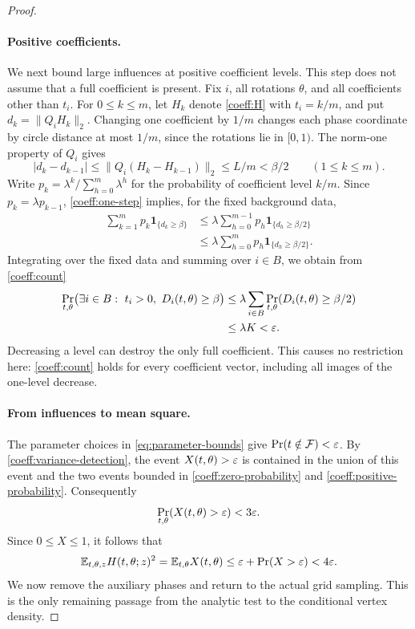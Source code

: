 \begin{proof}
\paragraph{Positive coefficients.}
We next bound large influences at positive coefficient levels.  This
step does not assume that a full coefficient is present.  Fix $i$,
all rotations $\theta$, and all coefficients other than $t_i$.
For $0\le k\le m$, let $H_k$ denote \eqref{coeff:H} with $t_i=k/m$,
and put $d_k=\|Q_iH_k\|_2$.  Changing one coefficient by $1/m$
changes each phase coordinate by circle distance at most $1/m$, since
the rotations lie in $[0,1)$.  The norm-one property of $Q_i$ gives
\begin{equation}\label{coeff:one-step}
 |d_k-d_{k-1}|
 \le\|Q_i(H_k-H_{k-1})\|_2
 \le L/m<\beta/2
 \qquad(1\le k\le m).
\end{equation}
Write $p_k=\lambda^k/\sum_{h=0}^m\lambda^h$ for the probability
of coefficient level $k/m$.  Since $p_k=\lambda p_{k-1}$,
\eqref{coeff:one-step} implies, for the fixed background data,
\begin{align*}
 \sum_{k=1}^m p_k\mathbf 1_{\{d_k\ge\beta\}}
 &\le\lambda\sum_{h=0}^{m-1}
              p_h\mathbf 1_{\{d_h\ge\beta/2\}}\\
 &\le\lambda\sum_{h=0}^m
              p_h\mathbf 1_{\{d_h\ge\beta/2\}}.
\end{align*}
Integrating over the fixed data and summing over $i\in B$, we obtain
from \eqref{coeff:count}
\begin{equation}\label{coeff:positive-probability}
 \begin{split}
 \Pr_{t,\theta}\bigl(
 \exists i\in B:\ t_i>0,\ D_i(t,\theta)\ge\beta
 \bigr)
 &\le\lambda\sum_{i\in B}
          \Pr_{t,\theta}(D_i(t,\theta)\ge\beta/2)\\
 &\le\lambda K<\varepsilon.
 \end{split}
\end{equation}
Decreasing a level can destroy the only full coefficient.  This causes
no restriction here: \eqref{coeff:count} holds for every coefficient
vector, including all images of the one-level decrease.

\paragraph{From influences to mean square.}
The parameter choices in \eqref{eq:parameter-bounds} give
$\Pr(t\notin\mathcal F)<\varepsilon$.  By
\eqref{coeff:variance-detection}, the event $X(t,\theta)>\varepsilon$ is
contained in the union of this event and the two events bounded in
\eqref{coeff:zero-probability} and
\eqref{coeff:positive-probability}.  Consequently
\[
 \Pr_{t,\theta}(X(t,\theta)>\varepsilon)<3\varepsilon.
\]
Since $0\le X\le1$, it follows that
\begin{equation}\label{coeff:mean-square}
 \mathbb E_{t,\theta,z}H(t,\theta;z)^2
 =\mathbb E_{t,\theta}X(t,\theta)
 \le\varepsilon+\Pr(X>\varepsilon)<4\varepsilon.
\end{equation}
We now remove the auxiliary phases and return to the actual grid
sampling.  This is the only remaining passage from the analytic test
to the conditional vertex density.


\end{proof}
